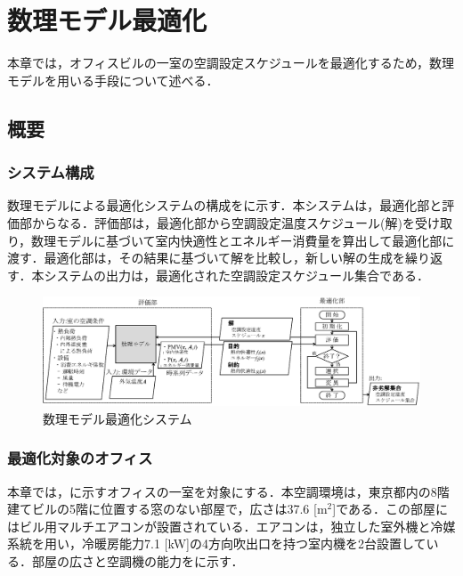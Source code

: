 \chapter{数理モデル最適化}
\label{chap::math}

\hspace{1zw}本章では，オフィスビルの一室の空調設定スケジュールを最適化するため，数理モデルを用いる手段について述べる．
\section{概要}

\subsection{システム構成}
\hspace{1zw}数理モデルによる最適化システムの構成をに示す．本システムは，最適化部と評価部からなる．評価部は，最適化部から空調設定温度スケジュール(解)を受け取り，数理モデルに基づいて室内快適性とエネルギー消費量を算出して最適化部に渡す．最適化部は，その結果に基づいて解を比較し，新しい解の生成を繰り返す．本システムの出力は，最適化された空調設定スケジュール集合である．

\begin{figure}[t]
  \begin{center}
    \includegraphics[width=1.1\linewidth]{fig/math_system.eps}
  \end{center}
  \vspace{-0.5cm}
  \caption{数理モデル最適化システム}
  \label{fig::math_system}
\end{figure}


\subsection{最適化対象のオフィス}
本章では，に示すオフィスの一室を対象にする．本空調環境は，東京都内の8階建てビルの5階に位置する窓のない部屋で，広さは37.6 [m$^2$]である．この部屋にはビル用マルチエアコンが設置されている．エアコンは，独立した室外機と冷媒系統を用い，冷暖房能力7.1 [kW]の4方向吹出口を持つ室内機を2台設置している．部屋の広さと空調機の能力をに示す．

